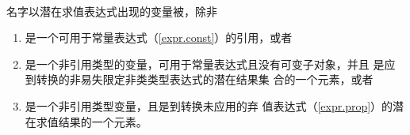 \paragraph{} %
名字以潜在求值表达式出现的变量被\df{\odruse}，除非
\begin{enumerate}
  \item {}是一个可用于常量表达式（\ref{expr.const}）的引用，或者
  \item {}是一个非引用类型的变量，可用于常量表达式且没有可变子对象，并且
        是应\lvalue{}到\rvalue{}转换的非易失限定非类类型表达式的潜在结果集
        合的一个元素，或者
  \item {}是一个非引用类型变量，且是\lvalue{}到\rvalue{}转换未应用的弃
        值表达式（\ref{expr.prop}）的潜在求值结果的一个元素。
\end{enumerate}
